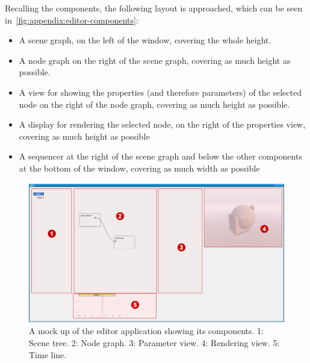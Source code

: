 \documentclass[%
    a4paper,    %
    justified,  %
    nobib,      %
    openany     %
]{tufte-book}
\makeatletter
\renewcommand{\label}[1]{\@tufte@label{##1}}%
\makeatother
\begin{document}
Recalling the components, the following layout is approached, which can be seen in~\cref{fig:appendix:editor-components}:

\begin{itemize}
\item{%
    A scene graph, on the left of the window, covering the whole height.}
\item{%
    A node graph on the right of the scene graph, covering as much height as
    possible.}
\item{%
    A view for showing the properties (and therefore parameters) of the selected
    node on the right of the node graph, covering as much height as possible.}
\item{%
    A display for rendering the selected node, on the right of the properties
    view, covering as much height as possible}
\item{%
    A sequencer at the right of the scene graph and below the other components
    at the bottom of the window, covering as much width as possible}
\end{itemize}

\begin{figure}[ht]
  \caption{%
    A mock up of the editor application showing its components.\newline{}
    1: Scene tree.\newline{}
    2: Node graph.\newline{}
    3: Parameter view.\newline{}
    4: Rendering view.\newline{}
    5: Time line.
  }
\label{fig:appendix:editor-components}
  \includegraphics[width=0.95\linewidth]{images/editor-components}
\end{figure}
\end{document}
